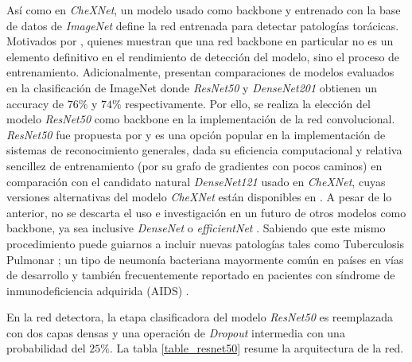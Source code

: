 Así como en \textit{CheXNet}, un modelo usado como backbone y entrenado con la base de datos de
\textit{ImageNet} define la red entrenada para detectar patologías torácicas. Motivados por
\citeauthor{bressem2020comparing, shazia2021comparative}, quienes muestran que una red backbone en
particular no es un elemento definitivo en el rendimiento de detección del modelo, sino el proceso
de entrenamiento. Adicionalmente, \citeauthor{huang2017densely, luo2020comparison} presentan
comparaciones de modelos evaluados en la clasificación de ImageNet donde \textit{ResNet50} y
\textit{DenseNet201} obtienen un accuracy de $76\%$ y $74\%$ respectivamente. Por ello, se realiza
la elección del modelo \textit{ResNet50} como backbone en la implementación de la red convolucional.
\textit{ResNet50} fue propuesta por \citeauthor{he2016deep} y es una opción popular en la
implementación de sistemas de reconocimiento generales, dada su eficiencia computacional y
relativa sencillez de entrenamiento (por su grafo de gradientes con pocos caminos) en comparación
con el candidato natural \textit{DenseNet121} usado en \textit{CheXNet}, cuyas versiones alternativas
del modelo \textit{CheXNet} están disponibles en \cite{chexnet_code}. A pesar de lo anterior, no se
descarta el uso e investigación en un futuro de otros modelos como backbone, ya sea inclusive
\textit{DenseNet} o \textit{efficientNet} \cite{tan2019efficientnet}. Sabiendo que este mismo
procedimiento puede guiarnos a incluir nuevas patologías tales como Tuberculosis Pulmonar
\cite{stirenko2018chest}; un tipo de neumonía bacteriana mayormente común en países en vías de
desarrollo y también frecuentemente reportado en pacientes con síndrome de inmunodeficiencia
adquirida (AIDS) \cite{matsuura2018tuberculous}.


En la red detectora, la etapa clasificadora del modelo \textit{ResNet50} es reemplazada con dos capas
densas y una operación de \textit{Dropout} intermedia con una probabilidad del $25\%$. La tabla
\ref{table_resnet50} resume la arquitectura de la red.


